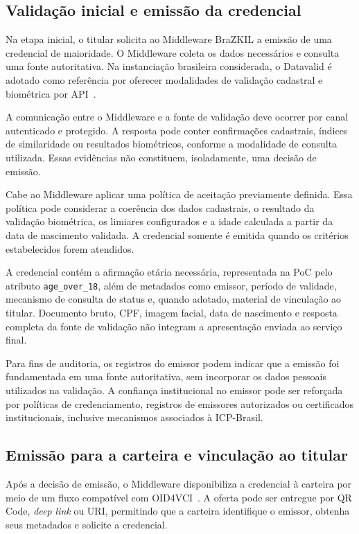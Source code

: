 \documentclass[12pt]{article}
\begin{document}
\subsection{Validação inicial e emissão da credencial}
\label{sec:validacao-emissao}

Na etapa inicial, o titular solicita ao Middleware BraZKIL a emissão de uma
credencial de maioridade. O Middleware coleta os dados necessários e
consulta uma fonte autoritativa. Na instanciação brasileira considerada, o
Datavalid é adotado como referência por oferecer modalidades de validação
cadastral e biométrica por API~\cite{serpro2024datavalid}.

A comunicação entre o Middleware e a fonte de validação deve ocorrer por
canal autenticado e protegido. A resposta pode conter confirmações
cadastrais, índices de similaridade ou resultados biométricos, conforme a
modalidade de consulta utilizada. Essas evidências não constituem,
isoladamente, uma decisão de emissão.

Cabe ao Middleware aplicar uma política de aceitação previamente definida.
Essa política pode considerar a coerência dos dados cadastrais, o resultado
da validação biométrica, os limiares configurados e a idade calculada a
partir da data de nascimento validada. A credencial somente é emitida quando
os critérios estabelecidos forem atendidos.

A credencial contém a afirmação etária necessária, representada na PoC pelo
atributo \texttt{age\_over\_18}, além de metadados como emissor, período de
validade, mecanismo de consulta de status e, quando adotado, material de
vinculação ao titular. Documento bruto, CPF, imagem facial, data de
nascimento e resposta completa da fonte de validação não integram a
apresentação enviada ao serviço final.

Para fins de auditoria, os registros do emissor podem indicar que a emissão
foi fundamentada em uma fonte autoritativa, sem incorporar os dados pessoais
utilizados na validação. A confiança institucional no emissor pode ser
reforçada por políticas de credenciamento, registros de emissores
autorizados ou certificados institucionais, inclusive mecanismos associados
à ICP-Brasil.

\subsection{Emissão para a carteira e vinculação ao titular}
\label{sec:emissao-carteira}

Após a decisão de emissão, o Middleware disponibiliza a credencial à
carteira por meio de um fluxo compatível com OID4VCI~\cite{openid4vci2024}.
A oferta pode ser entregue por QR Code, \textit{deep link} ou URI,
permitindo que a carteira identifique o emissor, obtenha seus metadados e
solicite a credencial.
\end{document}
